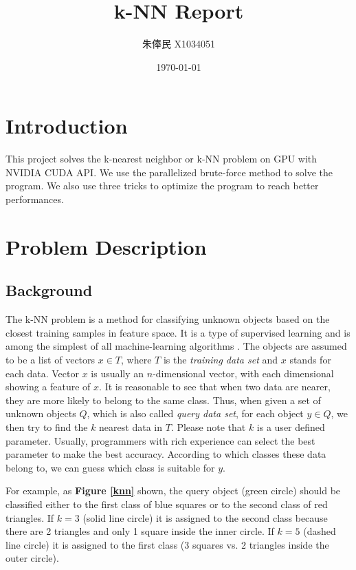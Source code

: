 \documentclass[11pt, a4paper]{article}
\title{\textbf{k-NN Report}}
\author{\kai 朱俸民 \quad X1034051}
\date{\today}
\newcommand{\fref}[1]{\textbf{Figure \ref{#1}}}
\begin{document}
\maketitle

\section{Introduction}

This project solves the k-nearest neighbor or k-NN problem on GPU with NVIDIA CUDA API. We use the parallelized brute-force method to solve the program. We also use three tricks to optimize the program to reach better performances.

\section{Problem Description}

\subsection{Background}

The k-NN problem is a method for classifying unknown objects based on the closest training samples in feature space. It is a type of supervised learning and is among the simplest of all machine-learning algorithms \cite{1}. The objects are assumed to be a list of vectors $x \in T$, where $T$ is the \textit{training data set} and $x$ stands for each data. Vector $x$ is usually an $n$-dimensional vector, with each dimensional showing a feature of $x$. It is reasonable to see that when two data are nearer, they are more likely to belong to the same class. Thus, when given a set of unknown objects $Q$, which is also called \textit{query data set}, for each object $y \in Q$, we then try to find the $k$ nearest data in $T$. Please note that $k$ is a user defined parameter. Usually, programmers with rich experience can select the best parameter to make the best accuracy. According to which classes these data belong to, we can guess which class is suitable for $y$.

For example, as \fref{knn} shown, the query object (green circle) should be classified either to the first class of blue squares or to the second class of red triangles. If $k = 3$ (solid line circle) it is assigned to the second class because there are 2 triangles and only 1 square inside the inner circle. If $k = 5$ (dashed line circle) it is assigned to the first class (3 squares vs. 2 triangles inside the outer circle).
\end{document}
